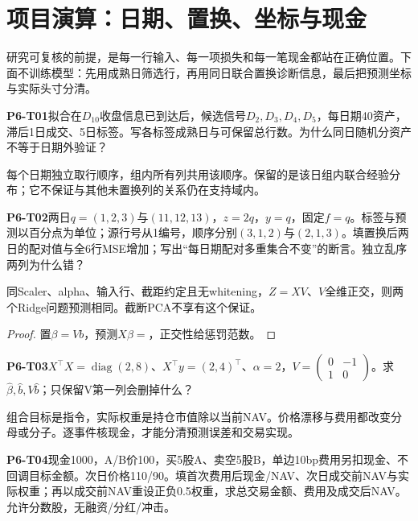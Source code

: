 \clearpage\section{项目演算：日期、置换、坐标与现金}
\begin{strand}
研究可复核的前提，是每一行输入、每一项损失和每一笔现金都站在正确位置。下面不训练模型：先用成熟日筛选行，再用同日联合置换诊断信息，最后把预测坐标与实际头寸分清。
\end{strand}
\begin{yourturn}\textbf{P6-T01}\quad 拟合在$D_{10}$收盘信息已到达后，候选信号$D_2,D_3,D_4,D_5$，每日期40资产，滞后1日成交、5日标签。写各标签成熟日与可保留总行数。为什么同日随机分资产不等于日期外验证？\workspace[4]\end{yourturn}
\begin{definition}[同日联合置换]
每个日期独立取行顺序，组内所有列共用该顺序。保留的是该日组内联合经验分布；它不保证与其他未置换列的关系仍在支持域内。
\end{definition}
\begin{yourturn}\textbf{P6-T02}\quad 两日$q=(1,2,3)$与$(11,12,13)$，$z=2q$，$y=q$，固定$f=q$。标签与预测以百分点为单位；源行号从1编号，顺序分别$(3,1,2)$与$(2,1,3)$。填置换后两日的配对值与全6行MSE增加；写出“每日期配对多重集合不变”的断言。独立乱序两列为什么错？\workspace[4]\end{yourturn}
\clearpage
\begin{proposition}[全维正交控制]
同Scaler、alpha、输入行、截距约定且无whitening，$Z=XV$、$V$全维正交，则两个Ridge问题预测相同。截断PCA不享有这个保证。
\end{proposition}
\begin{proof}
置$\beta=Vb$，预测$X\beta=$\fillin[2cm]，正交性给惩罚范数\fillin[2.2cm]。
\end{proof}
\begin{yourturn}\textbf{P6-T03}\quad $X^\top X=\operatorname{diag}(2,8)$、$X^\top y=(2,4)^\top$、$\alpha=2$，$V=\begin{pmatrix}0&-1\\1&0\end{pmatrix}$。求$\hat\beta,\hat b,V\hat b$；只保留V第一列会删掉什么？\workspace[4]\end{yourturn}
\clearpage
\begin{strand}
组合目标是指令，实际权重是持仓市值除以当前NAV。价格漂移与费用都改变分母或分子。逐事件核现金，才能分清预测误差和交易实现。
\end{strand}
\begin{yourturn}\textbf{P6-T04}\quad 现金1000，A/B价100，买5股A、卖空5股B，单边10bp费用另扣现金、不回调目标金额。次日价格110/90。填首次费用后现金/NAV、次日成交前NAV与实际权重；再以成交前NAV重设正负0.5权重，求总交易金额、费用及成交后NAV。允许分数股，无融资/分红/冲击。\workspace[6]\end{yourturn}

